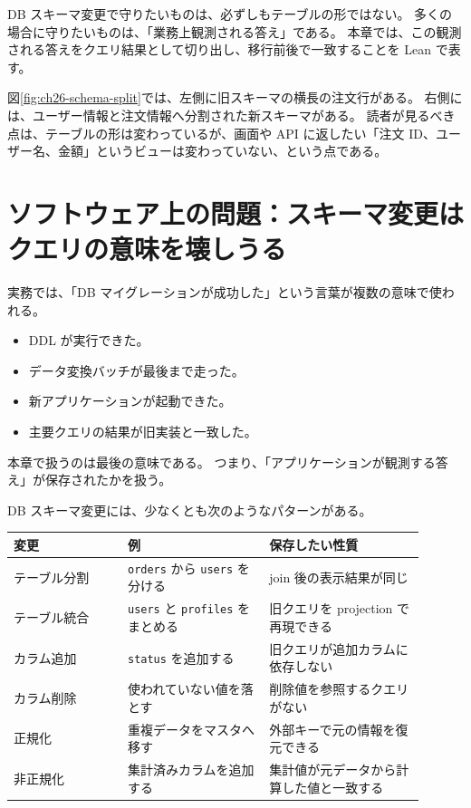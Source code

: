\begin{intuitionbox}
DB スキーマ変更で守りたいものは、必ずしもテーブルの形ではない。
多くの場合に守りたいものは、「業務上観測される答え」である。
本章では、この観測される答えをクエリ結果として切り出し、移行前後で一致することを Lean で表す。
\end{intuitionbox}


図\ref{fig:ch26-schema-split}では、左側に旧スキーマの横長の注文行がある。
右側には、ユーザー情報と注文情報へ分割された新スキーマがある。
読者が見るべき点は、テーブルの形は変わっているが、画面や API に返したい「注文 ID、ユーザー名、金額」というビューは変わっていない、という点である。

\section{ソフトウェア上の問題：スキーマ変更はクエリの意味を壊しうる}

\begin{softwarebox}
実務では、「DB マイグレーションが成功した」という言葉が複数の意味で使われる。
\begin{itemize}
\item DDL が実行できた。
\item データ変換バッチが最後まで走った。
\item 新アプリケーションが起動できた。
\item 主要クエリの結果が旧実装と一致した。
\end{itemize}
本章で扱うのは最後の意味である。
つまり、「アプリケーションが観測する答え」が保存されたかを扱う。
\end{softwarebox}

DB スキーマ変更には、少なくとも次のようなパターンがある。

\begin{longtable}{p{0.25\linewidth}p{0.31\linewidth}p{0.34\linewidth}}
\toprule
変更 & 例 & 保存したい性質 \\
\midrule
テーブル分割 & \texttt{orders} から \texttt{users} を分ける & join 後の表示結果が同じ \\
テーブル統合 & \texttt{users} と \texttt{profiles} をまとめる & 旧クエリを projection で再現できる \\
カラム追加 & \texttt{status} を追加する & 旧クエリが追加カラムに依存しない \\
カラム削除 & 使われていない値を落とす & 削除値を参照するクエリがない \\
正規化 & 重複データをマスタへ移す & 外部キーで元の情報を復元できる \\
非正規化 & 集計済みカラムを追加する & 集計値が元データから計算した値と一致する \\
\bottomrule
\end{longtable}

